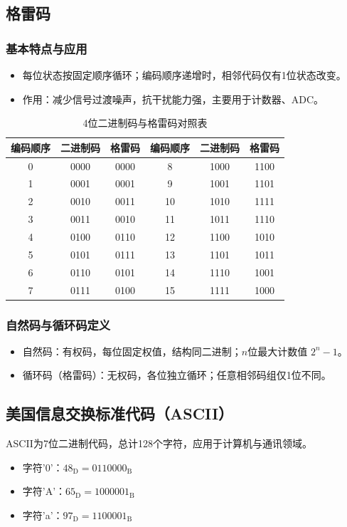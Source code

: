 \subsection{格雷码}
\subsubsection{基本特点与应用}
\begin{itemize}
    \item 每位状态按固定顺序循环；编码顺序递增时，相邻代码仅有1位状态改变。
    \item 作用：减少信号过渡噪声，抗干扰能力强，主要用于计数器、ADC。
\end{itemize}

\begin{table}[!htbp]
    \centering
    \setlength{\tabcolsep}{6pt}
    \renewcommand{\arraystretch}{1.2}
    \caption{4位二进制码与格雷码对照表}
    \label{tab:gray_4bit}
    \begin{tabular}{|c|c|c||c|c|c|}
        \hline
        编码顺序 & 二进制码 & 格雷码 & 编码顺序 & 二进制码 & 格雷码 \\
        \hline
        0 & 0000 & 0000 & 8  & 1000 & 1100 \\
        1 & 0001 & 0001 & 9  & 1001 & 1101 \\
        2 & 0010 & 0011 & 10 & 1010 & 1111 \\
        3 & 0011 & 0010 & 11 & 1011 & 1110 \\
        4 & 0100 & 0110 & 12 & 1100 & 1010 \\
        5 & 0101 & 0111 & 13 & 1101 & 1011 \\
        6 & 0110 & 0101 & 14 & 1110 & 1001 \\
        7 & 0111 & 0100 & 15 & 1111 & 1000 \\
        \hline
    \end{tabular}
\end{table}

\subsubsection{自然码与循环码定义}
\begin{itemize}
    \item 自然码：有权码，每位固定权值，结构同二进制；$n$位最大计数值 $2^n-1$。
    \item 循环码（格雷码）：无权码，各位独立循环；任意相邻码组仅1位不同。
\end{itemize}

\subsection{美国信息交换标准代码（ASCII）}
ASCII为7位二进制代码，总计128个字符，应用于计算机与通讯领域。
\begin{itemize}
    \item 字符'0'：$48_{\text{D}}=0110000_{\text{B}}$
    \item 字符'A'：$65_{\text{D}}=1000001_{\text{B}}$
    \item 字符'a'：$97_{\text{D}}=1100001_{\text{B}}$
\end{itemize}